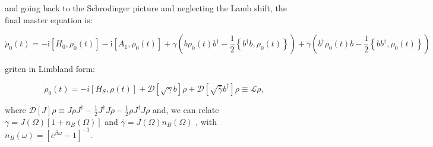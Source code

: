 \documentclass[%
preprint,
onecolumn,
notitlepag,
 amsmath,amssymb,
 aps,
 pra,
]{revtex4-2}
\begin{document}
and going back to the Schrodinger picture and neglecting the Lamb shift,  the final master equation is: 

\begin{equation}
    \dot{{\rho}}_{0}(t)=  -\mathrm{i}\left[ H_0  , {\rho}_{0}(t)\right] -\mathrm{i}\left[ A_1  , {\rho}_{0}(t)\right] +  \gamma \left(b {\rho}_{0}(t) b^{\dagger}-\frac{1}{2}\left\{b^{\dagger} b, {\rho}_{0}(t)\right\}\right)+\bar{\gamma} \left(b^{\dagger} {\rho}_{0}(t) b-\frac{1}{2}\left\{b b^{\dagger}, {\rho}_{0}(t)\right\}\right)
\end{equation}

griten in Limbland form:

\begin{equation}
\dot{\rho}_0(t) = -i [H_{S}, \rho(t)] + \mathcal{D}[\sqrt{\gamma} b] \rho + \mathcal{D}[\sqrt{\bar{\gamma}} b^{\dag}] \rho \equiv \mathcal{L}\rho,
\end{equation}

 where $\mathcal{D}[J]\rho \equiv J\rho J^{\dag} - \frac{1}{2} J^{\dag} J \rho - \frac{1}{2}  \rho J^{\dag} J \rho$ and, we can  relate $\gamma=J(\Omega)\left[1+n_{B}(\Omega)\right] $ and $ \bar{\gamma} = J(\Omega) n_{B}(\Omega)$  , with   $n_{B}(\omega)=\left[e^{\beta \omega}-1\right]^{-1}$. 




%
%
%
\end{document}
